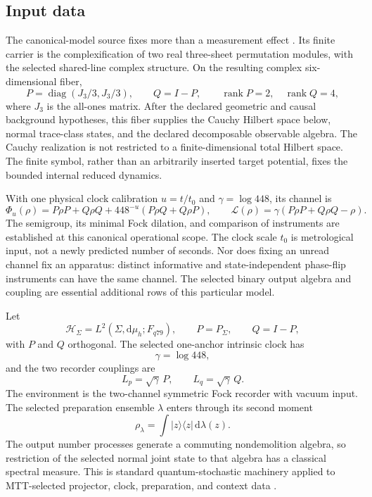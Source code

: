 \documentclass[11pt]{article}
\theoremstyle{definition}
\theoremstyle{remark}
\newcommand{\cH}{\mathcal H}
\newcommand{\dd}{\mathrm d}
\begin{document}
\subsection{Input data}

\label{sec:canonical-model}
The canonical-model source fixes more than a measurement effect
\cite{FrozenCanonicalQM}. Its finite carrier is the complexification of two
real three-sheet permutation modules, with the selected shared-line complex
structure. On the resulting complex six-dimensional fiber,
\[
P=\operatorname{diag}(J_3/3,J_3/3),\qquad Q=I-P,
\qquad \operatorname{rank}P=2,\quad\operatorname{rank}Q=4,
\]
where \(J_3\) is the all-ones matrix. After the declared geometric and causal
background hypotheses, this fiber supplies the Cauchy Hilbert space below,
normal trace-class states, and the declared decomposable observable algebra.
The Cauchy realization is not restricted to a finite-dimensional total
Hilbert space. The finite symbol, rather than an arbitrarily inserted target
potential, fixes the bounded internal reduced dynamics.

With one physical clock calibration \(u=t/t_0\) and
\(\gamma=\log448\), its channel is
\[
\Phi_u(\rho)=P\rho P+Q\rho Q+448^{-u}(P\rho Q+Q\rho P),
\qquad
\mathcal L(\rho)=\gamma(P\rho P+Q\rho Q-\rho).
\]
The semigroup, its minimal Fock dilation, and comparison of instruments are
established at this canonical operational scope. The clock scale \(t_0\)
is metrological input, not a newly predicted number of seconds. Nor does
fixing an unread channel fix an apparatus: distinct informative and
state-independent phase-flip instruments can have the same channel. The
selected binary output algebra and coupling are essential additional rows
of this particular model.

Let
\[
\cH_\Sigma=L^2(\Sigma,\dd\mu_h;F_{q79}),
\qquad
P=P_\Sigma,
\qquad
Q=I-P,
\]
with \(P\) and \(Q\) orthogonal.  The selected one-anchor intrinsic clock has
\[
\gamma=\log 448,
\]
and the two recorder couplings are
\[
L_p=\sqrt{\gamma}\,P,
\qquad
L_q=\sqrt{\gamma}\,Q.
\]
The environment is the two-channel symmetric Fock recorder with vacuum
input.  The selected preparation ensemble \(\lambda\) enters through its
second moment
\[
\rho_\lambda
=\int |z\rangle\langle z|\,\dd\lambda(z).
\]
The output number processes generate a commuting nondemolition algebra, so
restriction of the selected normal joint state to that algebra has a
classical spectral measure.  This is standard quantum-stochastic machinery
applied to MTT-selected projector, clock, preparation, and context data
\cite{HudsonParthasarathy1984,Belavkin2005,AttalPautrat2006}.
\end{document}
